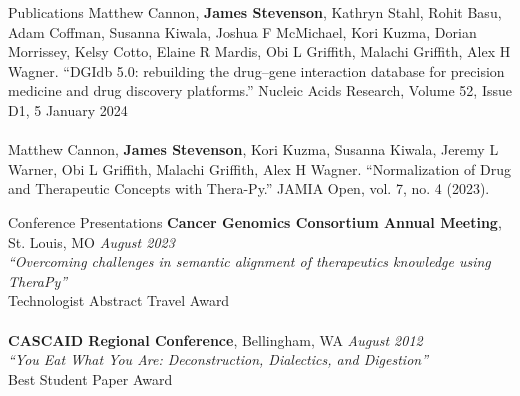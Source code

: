 \documentclass{cv} %
\begin{document}

\begin{rSection}{Publications}
{Matthew Cannon, \textbf{James Stevenson}, Kathryn Stahl, Rohit Basu, Adam Coffman, Susanna Kiwala, Joshua F McMichael, Kori Kuzma, Dorian Morrissey, Kelsy Cotto, Elaine R Mardis, Obi L Griffith, Malachi Griffith, Alex H Wagner. ``DGIdb 5.0: rebuilding the drug–gene interaction database for precision medicine and drug discovery platforms.'' Nucleic Acids Research, Volume 52, Issue D1, 5 January 2024}\\
\\
{Matthew Cannon, \textbf{James Stevenson}, Kori Kuzma, Susanna Kiwala, Jeremy L Warner, Obi L Griffith, Malachi Griffith, Alex H Wagner. ``Normalization of Drug and Therapeutic Concepts with Thera-Py.'' JAMIA Open, vol. 7, no. 4 (2023).}
\end{rSection}


\begin{rSection}{Conference Presentations}
\textbf{ Cancer Genomics Consortium Annual Meeting}{, St. Louis, MO} \hfill {\em August 2023}\\
{\em ``Overcoming challenges in semantic alignment of therapeutics knowledge using TheraPy''}\\
{Technologist Abstract Travel Award}\\
\\
\textbf{ CASCAID Regional Conference}{, Bellingham, WA} \hfill {\em August 2012}\\
{\em ``You Eat What You Are: Deconstruction, Dialectics, and Digestion''}\\
{Best Student Paper Award}

\end{rSection}

\end{document}

